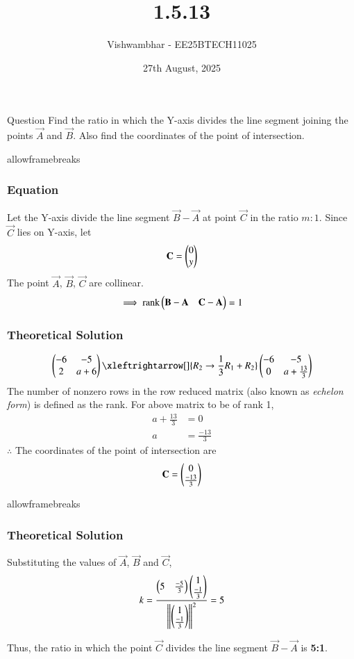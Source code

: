 \documentclass{beamer}
\title{1.5.13}
\date{27th August, 2025}
\author{Vishwambhar - EE25BTECH11025}
\begin{document}
\frame{\titlepage}
\begin{frame}{Question}
Find the ratio in which the Y-axis divides the line segment joining the points $\vec{A}$ and $\vec{B}$. Also find the coordinates of the point of intersection.
\end{frame}

\begin{frame}{allowframebreaks}
\frametitle{Equation}
Let the Y-axis divide the line segment $\vec{B}-\vec{A}$ at point $\vec{C}$ in the ratio $m:1$.
Since $\vec{C}$ lies on Y-axis, let
\begin{align*}
\mathbf{C} = \begin{pmatrix}0 \\ y\end{pmatrix}
\end{align*}
The point $\vec{A}$, $\vec{B}$, $\vec{C}$ are collinear.
\begin{align}
\implies \text{rank}\begin{pmatrix}\mathbf{B}-\mathbf{A} & \mathbf{C}-\mathbf{A}\end{pmatrix} = 1
\end{align}
\end{frame}

\begin{frame}[fragile]
	\frametitle{Theoretical Solution}
\begin{align}
	\myvec{-6 & -5 \\ 2 & a+6} \xleftrightarrow[]{R_2 \rightarrow {\frac{1}{3}R_1 + R_2}} \myvec{-6 & -5 \\ 0 & a+\frac{13}{3}}  
\end{align}
The number of nonzero rows in the row reduced matrix (also known as {\em echelon form}) is defined as the rank. For above matrix to be of rank 1,
\begin{align}
a+\frac{13}{3} &= 0 \\
a &= \frac{-13}{3}
\end{align}
$\therefore$ The coordinates of the point of intersection are 
\begin{align*}
\mathbf{C} = \begin{pmatrix}0 \\ \frac{-13}{3}\end{pmatrix}
\end{align*}
\end{frame}

\begin{frame}{allowframebreaks}
\frametitle{Theoretical Solution}
Substituting the values of $\vec{A}$, $\vec{B}$ and $\vec{C}$,
\begin{align}
k=\frac{\begin{pmatrix}5 & \frac{-5}{3}\end{pmatrix}\begin{pmatrix}1 \\ \frac{-1}{3}\end{pmatrix}}{\left\lVert\begin{pmatrix}1 \\ \frac{-1}{3}\end{pmatrix}\right\rVert^2}=5
\end{align}

Thus, the ratio in which the point $\vec{C}$ divides the line segment $\vec{B}-\vec{A}$ is \textbf{5:1}.
\end{frame}
\end{document}
